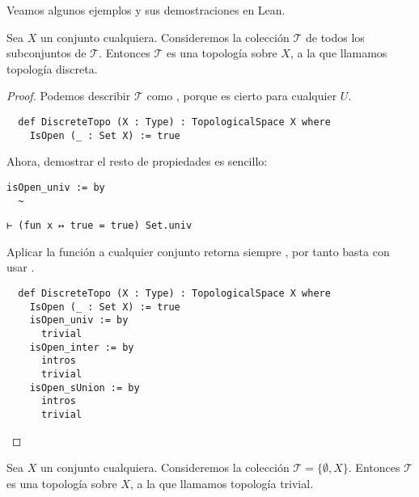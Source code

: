Veamos algunos ejemplos y sus demostraciones en Lean.

\begin{example}\label{ex:topologia-discreta}
    Sea $X$ un conjunto cualquiera. Consideremos la colección $\mathcal{T}$ de todos los subconjuntos de $\mathcal{T}$. Entonces $\mathcal{T}$ es una topología sobre $X$, a la que llamamos \textnormal{topología discreta}.
\end{example}

\begin{proof}
  Podemos describir $\mathcal T$ como , porque  es cierto para cualquier $U$.

  \begin{lstlisting}
  def DiscreteTopo (X : Type) : TopologicalSpace X where
    IsOpen (_ : Set X) := true \end{lstlisting}
  
  Ahora, demostrar el resto de propiedades es sencillo:

  \begin{minipage}[t]{0.58\textwidth}
\begin{lstlisting}[language=lean]
    isOpen_univ := by
  ~
\end{lstlisting}
\end{minipage}%
\hfill
\begin{minipage}[t]{0.40\textwidth}
\begin{lstlisting}[language=infoview]
  ⊢ (fun x ↦ true = true) Set.univ
\end{lstlisting}
\end{minipage}

Aplicar la función  a cualquier conjunto retorna siempre , por tanto basta con usar .

\begin{lstlisting}
  def DiscreteTopo (X : Type) : TopologicalSpace X where
    IsOpen (_ : Set X) := true
    isOpen_univ := by
      trivial
    isOpen_inter := by
      intros
      trivial
    isOpen_sUnion := by
      intros
      trivial
\end{lstlisting}

\end{proof}


\begin{example}\label{ex:topologia-trivial}
    Sea $X$ un conjunto cualquiera. Consideremos la colección $\mathcal{T}=\{\emptyset, X\}$. Entonces $\mathcal{T}$ es una topología sobre $X$, a la que llamamos \textnormal{topología trivial}.
\end{example}

